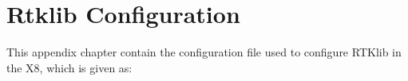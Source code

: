 \chapter{Rtklib Configuration}\label{APPENDIX:RTKLIB}
This appendix chapter contain the configuration file used to configure RTKlib in the X8, which is given as:
